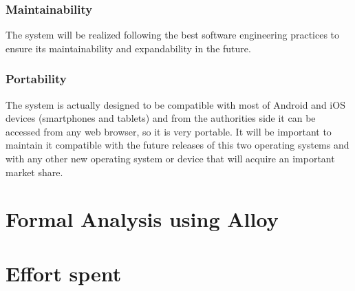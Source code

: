 \documentclass[a4paper]{report}
\begin{document}
\subsection{Maintainability}
The system will be realized following the best software engineering practices to ensure its maintainability and expandability in the future.
\subsection{Portability}
The system is actually designed to be compatible with most of Android and iOS devices (smartphones and tablets) and from the authorities side it can be accessed from any web browser, so it is very portable.
It will be important to maintain it compatible with the future releases of this two operating systems and with any other new operating system or device that will acquire an important market share.
\chapter{Formal Analysis using Alloy}
\lipsum[3]

\chapter{Effort spent}
\end{document}
